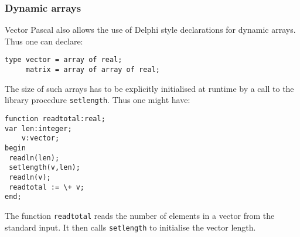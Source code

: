 \subsubsection{Dynamic arrays}
Vector Pascal also allows the use of Delphi style declarations for dynamic arrays. Thus one
can declare:
\begin{verbatim}
type vector = array of real;
     matrix = array of array of real;
\end{verbatim}
The size of such arrays has to be explicitly initialised at runtime by a call to the
library procedure {\tt setlength}.
Thus one might have:
\begin{verbatim}
function readtotal:real;
var len:integer;
    v:vector;
begin
 readln(len);
 setlength(v,len);
 readln(v);
 readtotal := \+ v;
end;
\end{verbatim}
The function {\tt readtotal} reads the number of elements in a vector from
the standard input. It then calls {\tt setlength} to initialise the vector length.
